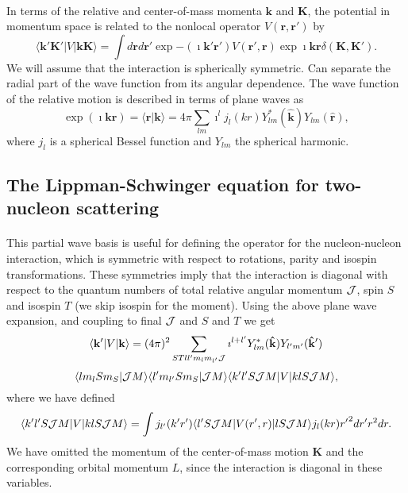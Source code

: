 \documentclass[%
twoside,                 %
final,                   %
10pt]{article}
\begin{document}
\paragraph{}
In terms of the relative and center-of-mass momenta $\mathbf{k}$ and
$\mathbf{K}$, the potential in momentum space is related to the nonlocal operator
$V(\mathbf{r},\mathbf{r}')$ by
\[
\langle\mathbf{k'K'}\vert V \vert \mathbf{kK}\rangle =\int d\mathbf{r}d \mathbf{r'}
        \exp{-(\imath \mathbf{k'r'})}V(\mathbf{r'},\mathbf{r})\exp{\imath \mathbf{kr}}\delta(\mathbf{K},\mathbf{K'}).
\]
We will assume that the interaction is spherically symmetric.
Can separate the radial part of the wave function from its
angular dependence. The wave function of the relative motion is described
in terms of plane waves as
\[
\exp{(\imath \mathbf{kr})} =\langle\mathbf{r}\vert\mathbf{k}\rangle= 4\pi\sum_{lm}\imath^{l}j_{l}(kr)Y_{lm}^{*}(\mathbf{\hat{k}})Y_{lm}(\mathbf{\hat{r}}),
\]
where $j_l$ is a spherical Bessel function and $Y_{lm}$ the
spherical harmonic.



\subsection*{The Lippman-Schwinger equation for two-nucleon scattering}

\paragraph{}
This partial wave basis is useful for defining the operator for
the nucleon-nucleon interaction, which
is symmetric with respect to rotations, parity and
isospin transformations. These symmetries imply that the interaction is
diagonal with respect to the quantum numbers of total relative angular
momentum ${\cal J}$, spin $S$ and isospin $T$ (we skip isospin for the moment). Using the above plane wave expansion,
and coupling to final ${\cal J}$ and $S$ and $T$ we get
\[
 \langle\mathbf{k'}\vert V \vert\mathbf{k}\rangle= (4\pi)^2 \sum_{STll'm_lm_{l'}{\cal J}}\imath^{l+l'} Y_{lm}^{*}(\mathbf{\hat{k}}) Y_{l'm'}(\mathbf{\hat{k}'})
\]
\[
\langle lm_lSm_S|{\cal J}M\rangle \langle l'm_{l'}Sm_S|{\cal J}M\rangle\langle k'l'S{\cal J}M\vert V \vert klS{\cal J}M\rangle,
\]
where we have defined
\[
    \langle k'l'S{\cal J}M\vert V \vert klS{\cal J}M\rangle=\int j_{l'}(k'r')\langle l'S{\cal J}M\vert V(r',r)\vert lS{\cal J}M\rangle j_l(kr) {r'}^2 dr' r^2 dr.
\]
We have omitted the momentum of the center-of-mass motion $\mathbf{K}$ and the 
corresponding orbital momentum $L$, since the interaction is diagonal
in these variables.
\end{document}
